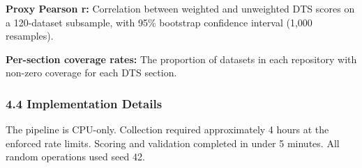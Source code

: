 \textbf{Proxy Pearson r:} Correlation between weighted and unweighted DTS scores on a 120-dataset subsample, with 95\% bootstrap confidence interval (1,000 resamples).

\textbf{Per-section coverage rates:} The proportion of datasets in each repository with non-zero coverage for each DTS section.

\subsubsection{4.4 Implementation Details}

The pipeline is CPU-only. Collection required approximately 4 hours at the enforced rate limits. Scoring and validation completed in under 5 minutes. All random operations used seed 42.
